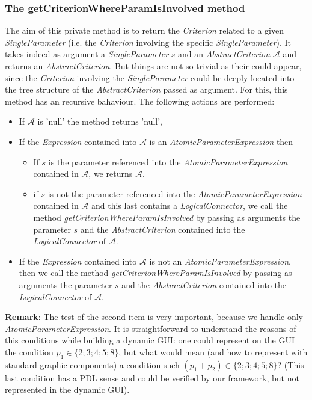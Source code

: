 \documentclass[a4paper,11pt] {ivoa}
\begin{document}
\subsubsection{The getCriterionWhereParamIsInvolved method}
The aim of this private method is to return the {\it Criterion} related to a given {\it SingleParameter} (i.e. the {\it Criterion} involving the specific {\it SingleParameter}). It takes indeed as argument a {\it SingleParameter} $s$ and an {\it AbstractCriterion} $\mathcal A$ and returns an {\it AbstractCriterion}.
But things are not so trivial as their could appear, since the {\it Criterion} involving the {\it SingleParameter} could be deeply located into the tree structure of the {\it AbstractCriterion} passed as argument. For this, this method has an recursive bahaviour. The following actions are performed:
\begin{itemize}
\item If $\mathcal A$ is 'null' the method returns 'null',
\item If the {\it Expression} contained into $\mathcal A$ is an {\it AtomicParameterExpression} then
\begin{itemize}
\item If $s$ is the parameter referenced into the {\it AtomicParameterExpression} contained in $\mathcal A$, we returns $\mathcal A$.
\item if $s$ is not the parameter referenced into the {\it AtomicParameterExpression} contained in $\mathcal A$ and this last contains a {\it LogicalConnector}, we call the method {\it getCriterionWhereParamIsInvolved} by passing as arguments the parameter $s$ and the {\it AbstractCriterion} contained into the {\it LogicalConnector} of $\mathcal A$.
\end{itemize}
\item If the {\it Expression} contained into $\mathcal A$ is not an {\it AtomicParameterExpression}, then we call the method  {\it getCriterionWhereParamIsInvolved} by passing as arguments the parameter $s$ and the {\it AbstractCriterion} contained into the {\it LogicalConnector} of $\mathcal A$.\\
\end{itemize}
{\bf Remark}: The test of the second item is very important, because  we handle only {\it AtomicParameterExpression}. It is straightforward to understand the reasons of this conditions while building a dynamic GUI: one could represent on the GUI the condition $p_1 \in \{2; 3; 4; 5; 8\}$, but what would mean (and how to represent with standard graphic components) a condition such $(p_1 + p_2) \in \{2; 3; 4; 5; 8\}$? (This last condition has a PDL sense and could be verified by our framework, but not represented in the dynamic GUI).
\end{document}
